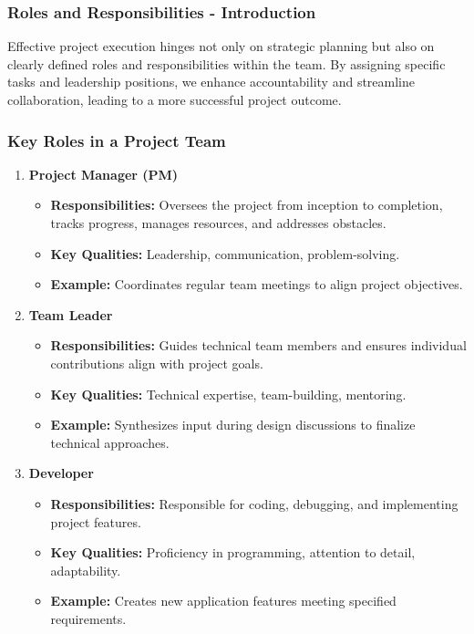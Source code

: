 \documentclass[aspectratio=169]{beamer}
\begin{document}
\begin{frame}[fragile]
    \frametitle{Roles and Responsibilities - Introduction}
    Effective project execution hinges not only on strategic planning but also on clearly defined roles and responsibilities within the team. By assigning specific tasks and leadership positions, we enhance accountability and streamline collaboration, leading to a more successful project outcome.
\end{frame}

\begin{frame}[fragile]
    \frametitle{Key Roles in a Project Team}
    \begin{enumerate}
        \item \textbf{Project Manager (PM)}
            \begin{itemize}
                \item \textbf{Responsibilities:} Oversees the project from inception to completion, tracks progress, manages resources, and addresses obstacles.
                \item \textbf{Key Qualities:} Leadership, communication, problem-solving.
                \item \textbf{Example:} Coordinates regular team meetings to align project objectives.
            \end{itemize}
        
        \item \textbf{Team Leader}
            \begin{itemize}
                \item \textbf{Responsibilities:} Guides technical team members and ensures individual contributions align with project goals.
                \item \textbf{Key Qualities:} Technical expertise, team-building, mentoring.
                \item \textbf{Example:} Synthesizes input during design discussions to finalize technical approaches.
            \end{itemize}
        
        \item \textbf{Developer}
            \begin{itemize}
                \item \textbf{Responsibilities:} Responsible for coding, debugging, and implementing project features.
                \item \textbf{Key Qualities:} Proficiency in programming, attention to detail, adaptability.
                \item \textbf{Example:} Creates new application features meeting specified requirements.
            \end{itemize}
    \end{enumerate}
\end{frame}
\end{document}
